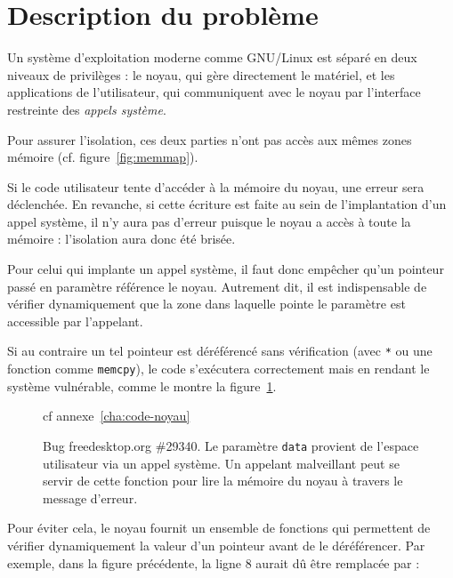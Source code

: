 \section{Description du problème}

\wip{}


Un système d'exploitation moderne comme GNU/Linux est séparé en deux niveaux de
privilèges : le noyau, qui gère directement le matériel, et les applications de
l'utilisateur, qui communiquent avec le noyau par l'interface restreinte des
\emph{appels système}.

Pour assurer l'isolation, ces deux parties n'ont pas accès aux mêmes zones
mémoire (cf. figure~\ref{fig:memmap}).

Si le code utilisateur tente d'accéder à la mémoire du noyau, une erreur sera
déclenchée. En revanche, si cette écriture est faite au sein de l'implantation
d'un appel système, il n'y aura pas d'erreur puisque le noyau a accès à toute la
mémoire : l'isolation aura donc été brisée.

Pour celui qui implante un appel système, il faut donc empêcher qu'un pointeur
passé en paramètre référence le noyau. Autrement dit, il est indispensable de
vérifier dynamiquement que la zone dans laquelle pointe le paramètre est
accessible par l'appelant\cite{hardy88confused}.

Si au contraire un tel pointeur est déréférencé sans vérification (avec
\texttt{*} ou une fonction comme \texttt{memcpy}), le code s'exécutera
correctement mais en rendant le système vulnérable, comme le montre la
figure~\ref{fig:radeon-bug}.


\begin{figure}
  cf annexe~\ref{cha:code-noyau}

  \caption[Bug freedesktop.org \#29340]{Bug freedesktop.org \#29340. Le
  paramètre \texttt{data} provient de l'espace utilisateur via un appel système.
  Un appelant malveillant peut se servir de cette fonction pour lire la mémoire
  du noyau à travers le message d'erreur.}

  \label{fig:radeon-bug}
\end{figure}

Pour éviter cela, le noyau fournit un ensemble de fonctions qui permettent de
vérifier dynamiquement la valeur d'un pointeur avant de le déréférencer. Par
exemple, dans la figure précédente, la ligne 8 aurait dû être remplacée par :

